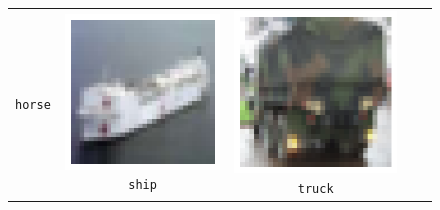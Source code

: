 \begin{figure}[h]
\begin{tabular}{ccccc}
\begin{minipage}[b]{0.15\linewidth}
      \centering\scriptsize\texttt{horse}
    \end{minipage} &
    \begin{minipage}[b]{0.15\linewidth}
      \includegraphics[width=\linewidth]{figures/cifar-images/ship.png}
      \centering\scriptsize\texttt{ship}
    \end{minipage} &
    \begin{minipage}[b]{0.15\linewidth}
      \includegraphics[width=\linewidth]{figures/cifar-images/truck.png}
      \centering\scriptsize\texttt{truck}
    \end{minipage}
  \end{tabular} 
\end{figure}